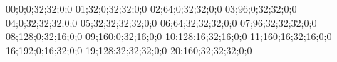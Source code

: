 00;0;0;32;32;0;0
01;32;0;32;32;0;0
02;64;0;32;32;0;0
03;96;0;32;32;0;0
04;0;32;32;32;0;0
05;32;32;32;32;0;0
06;64;32;32;32;0;0
07;96;32;32;32;0;0
08;128;0;32;16;0;0
09;160;0;32;16;0;0
10;128;16;32;16;0;0
11;160;16;32;16;0;0
16;192;0;16;32;0;0
19;128;32;32;32;0;0
20;160;32;32;32;0;0
